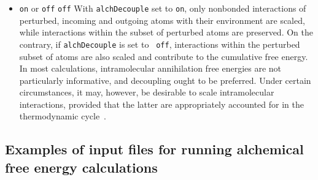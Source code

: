 \begin{itemize}
\item
{{\tt on} or {\tt off}} {{\tt off}} {With {\tt alchDecouple} set to {\tt on},
only nonbonded interactions of perturbed, incoming and outgoing atoms with
their environment are scaled, while interactions within the subset of perturbed
atoms are preserved. On the contrary, if {\tt alchDecouple} is set to {\tt
off}, interactions within the perturbed subset of atoms are also scaled and
contribute to the cumulative free energy. In most calculations, intramolecular
annihilation free energies are not particularly informative, and decoupling
ought to be preferred. Under certain circumstances, it may, however, be
desirable to scale intramolecular interactions, provided that the latter are
appropriately accounted for in the thermodynamic cycle~\cite{Chipot2007}. }


\end{itemize}



\subsection{Examples of input files for running alchemical free energy calculations}


